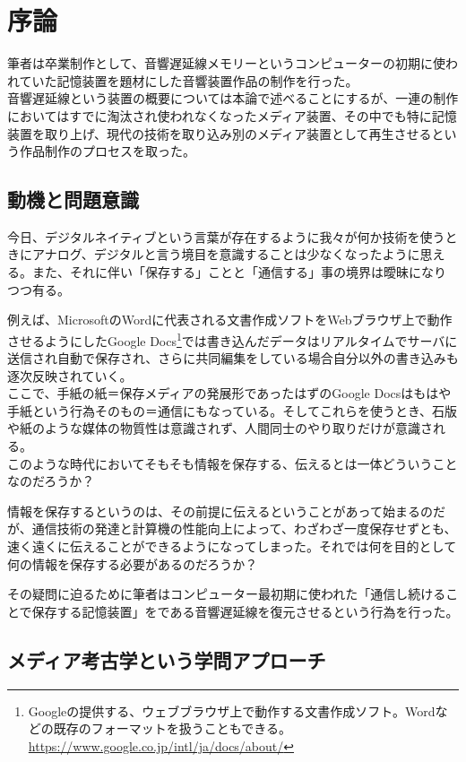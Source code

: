 \chapter{序論}\label{ux5e8fux8ad6}

筆者は卒業制作として、音響遅延線メモリーというコンピューターの初期に使われていた記憶装置を題材にした音響装置作品の制作を行った。\\
音響遅延線という装置の概要については本論で述べることにするが、一連の制作においてはすでに淘汰され使われなくなったメディア装置、その中でも特に記憶装置を取り上げ、現代の技術を取り込み別のメディア装置として再生させるという作品制作のプロセスを取った。

\section{動機と問題意識}\label{ux52d5ux6a5fux3068ux554fux984cux610fux8b58}

今日、デジタルネイティブという言葉が存在するように我々が何か技術を使うときにアナログ、デジタルと言う境目を意識することは少なくなったように思える。また、それに伴い「保存する」ことと「通信する」事の境界は曖昧になりつつ有る。

例えば、MicrosoftのWordに代表される文書作成ソフトをWebブラウザ上で動作させるようにしたGoogle
Docs\footnote{Googleの提供する、ウェブブラウザ上で動作する文書作成ソフト。Wordなどの既存のフォーマットを扱うこともできる。\url{https://www.google.co.jp/intl/ja/docs/about/}}では書き込んだデータはリアルタイムでサーバに送信され自動で保存され、さらに共同編集をしている場合自分以外の書き込みも逐次反映されていく。\\
ここで、手紙の紙＝保存メディアの発展形であったはずのGoogle
Docsはもはや手紙という行為そのもの＝通信にもなっている。そしてこれらを使うとき、石版や紙のような媒体の物質性は意識されず、人間同士のやり取りだけが意識される。\\
このような時代においてそもそも情報を保存する、伝えるとは一体どういうことなのだろうか？

情報を保存するというのは、その前提に伝えるということがあって始まるのだが、通信技術の発達と計算機の性能向上によって、わざわざ一度保存せずとも、速く遠くに伝えることができるようになってしまった。それでは何を目的として何の情報を保存する必要があるのだろうか？

その疑問に迫るために筆者はコンピューター最初期に使われた「通信し続けることで保存する記憶装置」をである音響遅延線を復元させるという行為を行った。

\section{メディア考古学という学問アプローチ}\label{ux30e1ux30c7ux30a3ux30a2ux8003ux53e4ux5b66ux3068ux3044ux3046ux5b66ux554fux30a2ux30d7ux30edux30fcux30c1}

